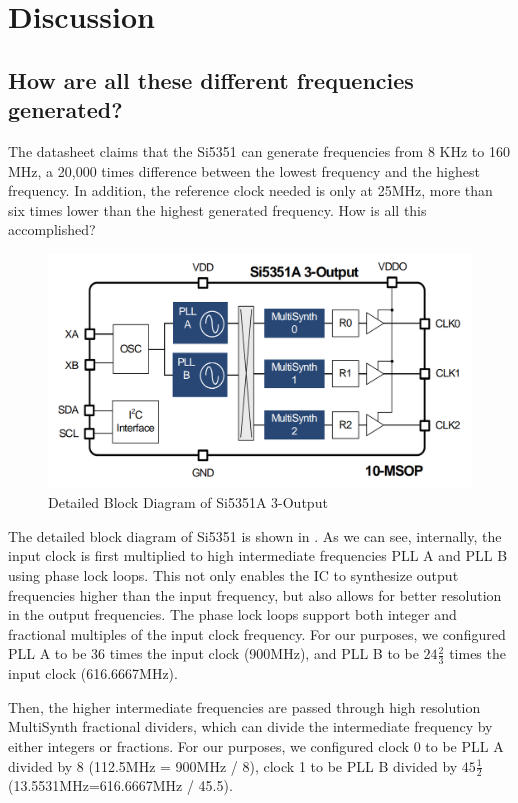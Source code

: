 \documentclass{article}
\begin{document}
\section{Discussion}

\subsection{How are all these different frequencies generated?}
\label{sec:block_diagram}

The datasheet claims that the Si5351 can generate frequencies from 8 KHz to 160 MHz, a 20,000 times difference between the lowest frequency and the highest frequency.
In addition, the reference clock needed is only at 25MHz, more than six times lower than the highest generated frequency.
How is all this accomplished?

\begin{figure}[h]
    \centering
    \includegraphics[width=.8\linewidth]{./pics/si5351a_block_diagram.png}
    \caption{Detailed Block Diagram of Si5351A 3-Output}
    \label{fig:si5351_block}
\end{figure}

The detailed block diagram of Si5351 is shown in .
As we can see, internally, the input clock is first multiplied to high intermediate frequencies PLL A and PLL B using phase lock loops.
This not only enables the IC to synthesize output frequencies higher than the input frequency, but also allows for better resolution in the output frequencies.
The phase lock loops support both integer and fractional multiples of the input clock frequency.
For our purposes, we configured PLL A to be 36 times the input clock (900MHz), and PLL B to be $24 \frac{2}{3}$ times the input clock (616.6667MHz).

Then, the higher intermediate frequencies are passed through high resolution MultiSynth fractional dividers, which can divide the intermediate frequency by either integers or fractions.
For our purposes, we configured clock 0 to be PLL A divided by 8 (112.5MHz = 900MHz / 8), clock 1 to be PLL B divided by $45\frac{1}{2}$ (13.5531MHz=616.6667MHz / 45.5).
\end{document}
